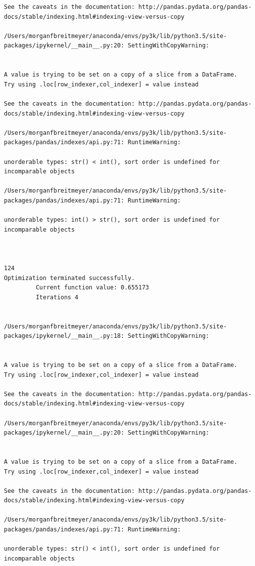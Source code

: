 \begin{lstlisting}
See the caveats in the documentation: http://pandas.pydata.org/pandas-docs/stable/indexing.html#indexing-view-versus-copy

/Users/morganfbreitmeyer/anaconda/envs/py3k/lib/python3.5/site-packages/ipykernel/__main__.py:20: SettingWithCopyWarning:


A value is trying to be set on a copy of a slice from a DataFrame.
Try using .loc[row_indexer,col_indexer] = value instead

See the caveats in the documentation: http://pandas.pydata.org/pandas-docs/stable/indexing.html#indexing-view-versus-copy

/Users/morganfbreitmeyer/anaconda/envs/py3k/lib/python3.5/site-packages/pandas/indexes/api.py:71: RuntimeWarning:

unorderable types: str() < int(), sort order is undefined for incomparable objects

/Users/morganfbreitmeyer/anaconda/envs/py3k/lib/python3.5/site-packages/pandas/indexes/api.py:71: RuntimeWarning:

unorderable types: int() > str(), sort order is undefined for incomparable objects



124
Optimization terminated successfully.
         Current function value: 0.655173
         Iterations 4


/Users/morganfbreitmeyer/anaconda/envs/py3k/lib/python3.5/site-packages/ipykernel/__main__.py:18: SettingWithCopyWarning:


A value is trying to be set on a copy of a slice from a DataFrame.
Try using .loc[row_indexer,col_indexer] = value instead

See the caveats in the documentation: http://pandas.pydata.org/pandas-docs/stable/indexing.html#indexing-view-versus-copy

/Users/morganfbreitmeyer/anaconda/envs/py3k/lib/python3.5/site-packages/ipykernel/__main__.py:20: SettingWithCopyWarning:


A value is trying to be set on a copy of a slice from a DataFrame.
Try using .loc[row_indexer,col_indexer] = value instead

See the caveats in the documentation: http://pandas.pydata.org/pandas-docs/stable/indexing.html#indexing-view-versus-copy

/Users/morganfbreitmeyer/anaconda/envs/py3k/lib/python3.5/site-packages/pandas/indexes/api.py:71: RuntimeWarning:

unorderable types: str() < int(), sort order is undefined for incomparable objects


\end{lstlisting}
